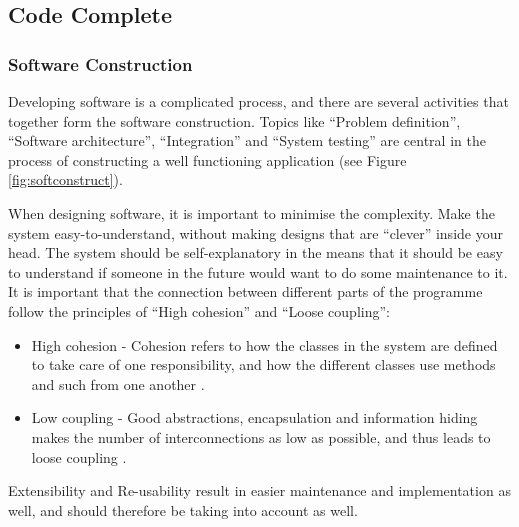 \subsection{Code Complete}
\subsubsection{Software Construction}
\label{sec:softconstruct}
Developing software is a complicated process, and there are several activities that together form the software construction. Topics like ``Problem definition'', ``Software architecture'', ``Integration'' and ``System testing'' are central in the process of constructing a well functioning application (see Figure \ref{fig:softconstruct}).


When designing software, it is important to minimise the complexity. Make the system easy-to-understand, without making designs that are ``clever'' inside your head. The system should be self-explanatory in the means that it should be easy to understand if someone in the future would want to do some maintenance to it. It is important that the connection between different parts of the programme follow the principles of ``High cohesion'' and ``Loose coupling'':
\begin{itemize}
    \item High cohesion - Cohesion refers to how the classes in the system are defined to take care of one responsibility, and how the different classes use methods and such from one another \cite{adamcarlson}.
    \item Low coupling - Good abstractions, encapsulation and information hiding makes the number of interconnections as low as possible, and thus leads to loose coupling \cite{adamcarlson}.
\end{itemize}
Extensibility and Re-usability result in easier maintenance and implementation as well, and should therefore be taking into account as well. 

